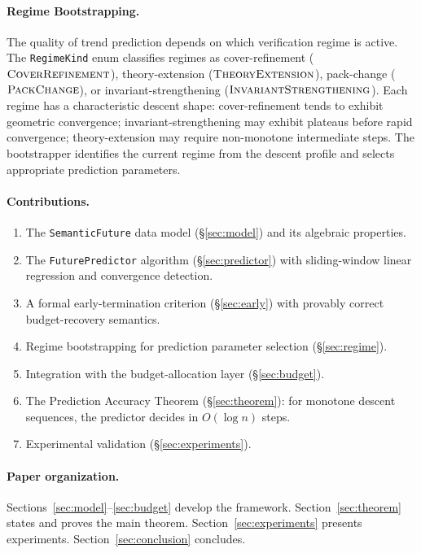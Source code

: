 \documentclass[11pt]{article}
\newcommand{\RKcov}{\textsc{CoverRefinement}}
\newcommand{\RKtheo}{\textsc{TheoryExtension}}
\newcommand{\RKpack}{\textsc{PackChange}}
\newcommand{\RKinv}{\textsc{InvariantStrengthening}}
\begin{document}
\paragraph{Regime Bootstrapping.}
The quality of trend prediction depends on which verification regime is
active.  The \texttt{RegimeKind} enum classifies regimes as
cover-refinement ($\RKcov$), theory-extension ($\RKtheo$), pack-change
($\RKpack$), or invariant-strengthening ($\RKinv$).  Each regime has
a characteristic descent shape: cover-refinement tends to exhibit
geometric convergence; invariant-strengthening may exhibit plateaus
before rapid convergence; theory-extension may require non-monotone
intermediate steps.  The bootstrapper identifies the current regime from
the descent profile and selects appropriate prediction parameters.

\paragraph{Contributions.}
\begin{enumerate}
  \item The \texttt{SemanticFuture} data model (§\ref{sec:model}) and
        its algebraic properties.
  \item The \texttt{FuturePredictor} algorithm (§\ref{sec:predictor})
        with sliding-window linear regression and convergence detection.
  \item A formal early-termination criterion (§\ref{sec:early}) with
        provably correct budget-recovery semantics.
  \item Regime bootstrapping for prediction parameter selection
        (§\ref{sec:regime}).
  \item Integration with the budget-allocation layer (§\ref{sec:budget}).
  \item The Prediction Accuracy Theorem (§\ref{sec:theorem}): for
        monotone descent sequences, the predictor decides in
        $O(\log n)$ steps.
  \item Experimental validation (§\ref{sec:experiments}).
\end{enumerate}

\paragraph{Paper organization.}
Sections~\ref{sec:model}--\ref{sec:budget} develop the framework.
Section~\ref{sec:theorem} states and proves the main theorem.
Section~\ref{sec:experiments} presents experiments.
Section~\ref{sec:conclusion} concludes.
\end{document}
